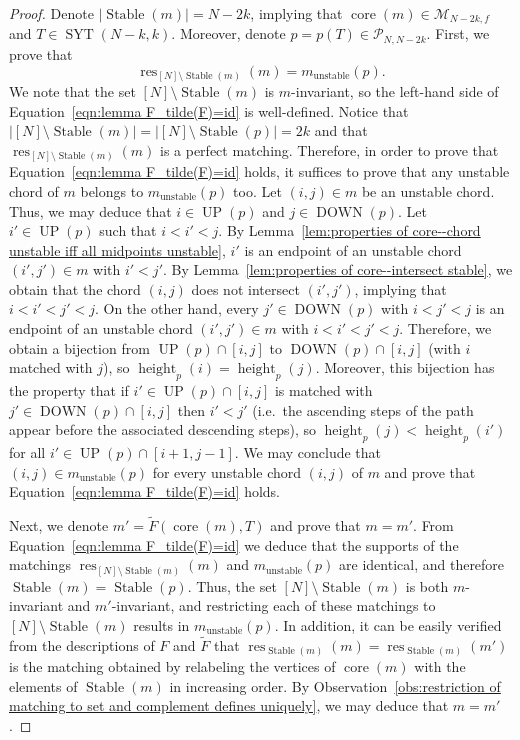 \documentclass[11pt]{article}
\theoremstyle{definition}
\providecommand{\ie}{i.e.\ }
\numberwithin{equation}{section}
\newcommand{\Syt}{\operatorname{SYT}}
\newcommand{\Stable}{\operatorname{Stable}}
\newcommand{\height}{\operatorname{height}}
\newcommand{\core}{\operatorname{core}}
\newcommand{\res}{\operatorname{res}}
\newcommand{\UP}{\operatorname{UP}}
\newcommand{\DOWN}{\operatorname{DOWN}}
\newcommand{\M}{\mathcal{M}}
\newcommand{\Pcal}{\mathcal{P}}
\begin{document}
\begin{proof}
    Denote $\left|\Stable(m)\right| = N-2k$, implying that $\core(m) \in \M_{N-2k,f}$ and $T \in \Syt(N-k,k)$. Moreover, denote $p=p(T) \in \Pcal_{N,N-2k}$. First, we prove that
    \begin{equation}
    \label{eqn:lemma F_tilde(F)=id}
        \res_{[N]\setminus\Stable(m)}(m) = m_{\text{unstable}}(p).
    \end{equation}
    We note that the set $[N] \setminus \Stable(m)$ is $m$-invariant, so the left-hand side of Equation~\eqref{eqn:lemma F_tilde(F)=id} is well-defined. Notice that $|[N]\setminus\Stable(m)| = |[N]\setminus\Stable(p)| = 2k$ and that $\res_{[N]\setminus\Stable(m)}(m)$ is a perfect matching. Therefore, in order to prove that Equation~\eqref{eqn:lemma F_tilde(F)=id} holds, it suffices to prove that any unstable chord of $m$ belongs to $m_{\text{unstable}}(p)$ too. Let $(i,j) \in m$ be an unstable chord. Thus, we may deduce that $i \in \UP(p)$ and $j \in \DOWN(p)$. Let $i' \in \UP(p)$ such that $i < i' < j$. By Lemma~\ref{lem:properties of core--chord unstable iff all midpoints unstable}, $i'$ is an endpoint of an unstable chord $(i',j') \in m$ with $i' < j'$. By Lemma~\ref{lem:properties of core--intersect stable}, we obtain that the chord $(i,j)$ does not intersect $(i',j')$, implying that $i < i' < j' < j$. On the other hand, every $j' \in \DOWN(p)$ with $i < j' < j$ is an endpoint of an unstable chord $(i',j') \in m$ with $i < i' < j' < j$. Therefore, we obtain a bijection from $\UP(p) \cap [i,j]$ to $\DOWN(p) \cap [i,j]$ (with $i$ matched with $j$), so $\height_p(i) = \height_p(j)$. Moreover, this bijection has the property that if $i' \in \UP(p) \cap [i,j]$ is matched with $j' \in \DOWN(p) \cap [i,j]$ then $i' < j'$ (\ie the ascending steps of the path appear before the associated descending steps), so $\height_p(j) < \height_p(i')$ for all $i' \in \UP(p) \cap [i+1,j-1]$. We may conclude that $(i,j) \in m_{\text{unstable}}(p)$ for every unstable chord $(i,j)$ of $m$ and prove that Equation~\eqref{eqn:lemma F_tilde(F)=id} holds.

    Next, we denote $m' = \tilde{F}(\core(m),T)$ and prove that $m=m'$. From Equation~\eqref{eqn:lemma F_tilde(F)=id} we deduce that the supports of the matchings $\res_{[N]\setminus\Stable(m)}(m)$ and $m_{\text{unstable}}(p)$ are identical, and therefore $\Stable(m) = \Stable(p)$. Thus, the set $[N]\setminus\Stable(m)$ is both $m$-invariant and $m'$-invariant, and restricting each of these matchings to $[N]\setminus\Stable(m)$ results in $m_{\text{unstable}}(p)$. In addition, it can be easily verified from the descriptions of $F$ and $\tilde{F}$ that $\res_{\Stable(m)}(m) = \res_{\Stable(m)}(m')$ is the matching obtained by relabeling the vertices of $\core(m)$ with the elements of $\Stable(m)$ in increasing order. By Observation~\ref{obs:restriction of matching to set and complement defines uniquely}, we may deduce that $m=m'$.
\end{proof}
\end{document}
